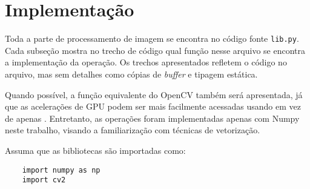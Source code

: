 \section{Implementação}

Toda a parte de processamento de imagem se encontra no código fonte \texttt{lib.py}. Cada subseção mostra no trecho de código qual função nesse arquivo se encontra a implementação da operação. Os trechos apresentados refletem o código no arquivo, mas sem detalhes como cópias de \textit{buffer} e tipagem estática.

Quando possível, a função equivalente do OpenCV também será apresentada, já que as acelerações de GPU podem ser mais facilmente acessadas usando  em vez de apenas  \autocite{ref:cvcuda}. Entretanto, as operações foram implementadas apenas com Numpy neste trabalho, visando a familiarização com técnicas de vetorização.

Assuma que as bibliotecas são importadas como:

\begin{verbatim}
    import numpy as np
    import cv2
\end{verbatim}





